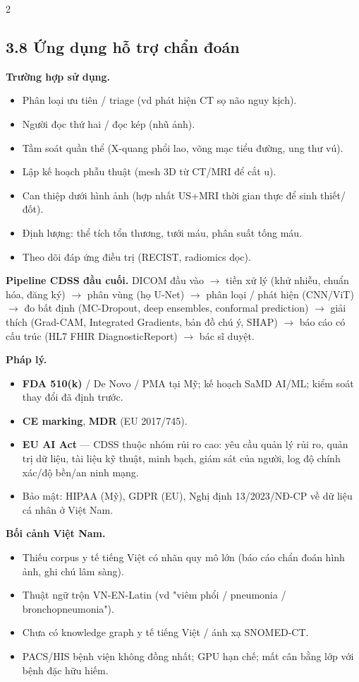 \begin{paracol}{2}
\switchcolumn

\subsection*{3.8 Ứng dụng hỗ trợ chẩn đoán}
\textbf{Trường hợp sử dụng.}
\begin{itemize}[leftmargin=*,nosep]
  \item Phân loại ưu tiên / triage (vd phát hiện CT sọ não nguy kịch).
  \item Người đọc thứ hai / đọc kép (nhũ ảnh).
  \item Tầm soát quần thể (X-quang phổi lao, võng mạc tiểu đường, ung thư vú).
  \item Lập kế hoạch phẫu thuật (mesh 3D từ CT/MRI để cắt u).
  \item Can thiệp dưới hình ảnh (hợp nhất US+MRI thời gian thực để sinh thiết/đốt).
  \item Định lượng: thể tích tổn thương, tưới máu, phân suất tống máu.
  \item Theo dõi đáp ứng điều trị (RECIST, radiomics dọc).
\end{itemize}

\textbf{Pipeline CDSS đầu cuối.}
DICOM đầu vào $\to$ tiền xử lý (khử nhiễu, chuẩn hóa, đăng ký) $\to$ phân vùng (họ U-Net) $\to$ phân loại / phát hiện (CNN/ViT) $\to$ đo bất định (MC-Dropout, deep ensembles, conformal prediction) $\to$ giải thích (Grad-CAM, Integrated Gradients, bản đồ chú ý, SHAP) $\to$ báo cáo có cấu trúc (HL7 FHIR DiagnosticReport) $\to$ bác sĩ duyệt.

\textbf{Pháp lý.}
\begin{itemize}[leftmargin=*,nosep]
  \item \textbf{FDA 510(k)} / De Novo / PMA tại Mỹ; kế hoạch SaMD AI/ML; kiểm soát thay đổi đã định trước.
  \item \textbf{CE marking}, \textbf{MDR} (EU 2017/745).
  \item \textbf{EU AI Act} — CDSS thuộc nhóm rủi ro cao: yêu cầu quản lý rủi ro, quản trị dữ liệu, tài liệu kỹ thuật, minh bạch, giám sát của người, log độ chính xác/độ bền/an ninh mạng.
  \item Bảo mật: HIPAA (Mỹ), GDPR (EU), Nghị định 13/2023/NĐ-CP về dữ liệu cá nhân ở Việt Nam.
\end{itemize}

\textbf{Bối cảnh Việt Nam.}
\begin{itemize}[leftmargin=*,nosep]
  \item Thiếu corpus y tế tiếng Việt có nhãn quy mô lớn (báo cáo chẩn đoán hình ảnh, ghi chú lâm sàng).
  \item Thuật ngữ trộn VN-EN-Latin (vd "viêm phổi / pneumonia / bronchopneumonia").
  \item Chưa có knowledge graph y tế tiếng Việt / ánh xạ SNOMED-CT.
  \item PACS/HIS bệnh viện không đồng nhất; GPU hạn chế; mất cân bằng lớp với bệnh đặc hữu hiếm.
\end{itemize}


\end{paracol}
